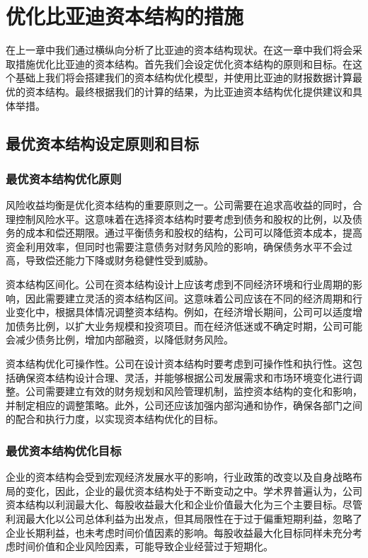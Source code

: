 \chapter{优化比亚迪资本结构的措施}
在上一章中我们通过横纵向分析了比亚迪的资本结构现状。在这一章中我们将会采取措施优化比亚迪的资本结构。首先我们会设定优化资本结构的原则和目标。在这个基础上我们将会搭建我们的资本结构优化模型，并使用比亚迪的财报数据计算最优的资本结构。最终根据我们的计算的结果，为比亚迪资本结构优化提供建议和具体举措。
\section{最优资本结构设定原则和目标}
\subsection{最优资本结构优化原则}
风险收益均衡是优化资本结构的重要原则之一。公司需要在追求高收益的同时，合理控制风险水平。这意味着在选择资本结构时要考虑到债务和股权的比例，以及债务的成本和偿还期限。通过平衡债务和股权的结构，公司可以降低资本成本，提高资金利用效率，但同时也需要注意债务对财务风险的影响，确保债务水平不会过高，导致偿还能力下降或财务稳健性受到威胁。

资本结构区间化。公司在资本结构设计上应该考虑到不同经济环境和行业周期的影响，因此需要建立灵活的资本结构区间。这意味着公司应该在不同的经济周期和行业变化中，根据具体情况调整资本结构。例如，在经济增长期间，公司可以适度增加债务比例，以扩大业务规模和投资项目。而在经济低迷或不确定时期，公司可能会减少债务比例，增加内部融资，以降低财务风险。

资本结构优化可操作性。公司在设计资本结构时要考虑到可操作性和执行性。这包括确保资本结构设计合理、灵活，并能够根据公司发展需求和市场环境变化进行调整。公司需要建立有效的财务规划和风险管理机制，监控资本结构的变化和影响，并制定相应的调整策略。此外，公司还应该加强内部沟通和协作，确保各部门之间的配合和执行力度，以实现资本结构优化的目标。
\subsection{最优资本结构优化目标}
企业的资本结构会受到宏观经济发展水平的影响，行业政策的改变以及自身战略布局的变化，因此，企业的最优资本结构处于不断变动之中。学术界普遍认为，公司资本结构以利润最大化、每股收益最大化和企业价值最大化为三个主要目标。尽管利润最大化以公司总体利益为出发点，但其局限性在于过于偏重短期利益，忽略了企业长期利益，也未考虑时间价值因素的影响。每股收益最大化目标同样未充分考虑时间价值和企业风险因素，可能导致企业经营过于短期化。

